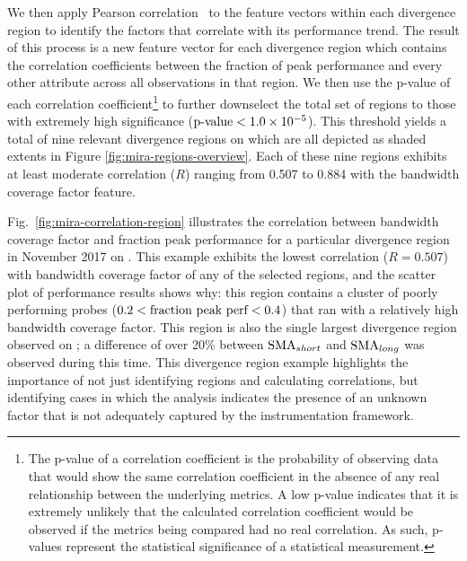 We then apply Pearson correlation~\cite{Falk97manyfaces} to the feature vectors within each divergence region to identify the factors that correlate with its
performance trend.
The result of this process is a new feature vector for each divergence region which contains the correlation coefficients between the fraction of peak performance and every other attribute across all observations in that region.
We then use the p-value of each correlation coefficient\footnote{
The p-value of a correlation coefficient is the probability of observing data that would show the same correlation coefficient in the absence of any real relationship between the underlying metrics.
A low p-value indicates that it is extremely unlikely that the calculated correlation coefficient would be observed if the metrics being compared had no real correlation.
As such, p-values represent the statistical significance of a statistical measurement.}
to further downselect the total set of regions to those with extremely high significance
($\textup{p-value} < {1.0 \times 10^{-5}}$).
This threshold yields a total of nine relevant divergence regions on \mira \mirafsone which are all depicted as shaded extents in Figure \ref{fig:mira-regions-overview}.
Each of these nine regions exhibits at least moderate correlation ($R$) ranging from 0.507 to 0.884 with the bandwidth coverage factor feature.

Fig.~\ref{fig:mira-correlation-region} illustrates the correlation between bandwidth coverage factor and fraction peak performance for a particular divergence region in November 2017 on \mira \mirafsone.
This example exhibits the lowest correlation ($R = 0.507$) with bandwidth coverage factor of any of the selected regions, and the scatter plot of performance results shows why:
this region contains a cluster of poorly performing probes (${0.2 < \textup{fraction peak perf} < 0.4}$) that ran with a relatively high bandwidth coverage factor.
This region is also the single largest divergence region observed on \mira; a difference of over 20\% between $\textup{SMA}_{short}$ and $\textup{SMA}_{long}$ was observed during this time.
This divergence region example highlights the importance of not just identifying regions and calculating correlations, but identifying cases in which the analysis indicates the presence of an unknown factor that is not adequately captured by the instrumentation framework.

